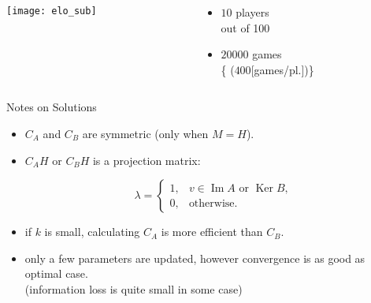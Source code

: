 \documentclass[fleqn,aspectratio=1610]{beamer}
\begin{document}
\begin{frame}[label={sec:org004bdab}]{}
\begin{columns}
\begin{column}{0.65\columnwidth}
\begin{center}
  \texttt{[image: elo\_sub]}%
\end{center}
\end{column}
\begin{column}{0.35\columnwidth}
\begin{itemize}
\item \(10\) players\\[0pt]
out of 100
\item \(20000\) games\\[0pt]
\{\small
(\(400\)[games/pl.])\}
\end{itemize}
\end{column}
\end{columns}
\end{frame}

\begin{frame}[label={sec:org22ea732}]{Notes on Solutions}
\begin{itemize}
\item \(C_{A}\) and \(C_{B}\) are symmetric (only when \(M=H\)).
\item \(C_{A}H\) or \(C_{B}H\) is a projection matrix:

\begin{equation}
  \lambda
  =
  \begin{cases}
    1,& v\in\operatorname{Im}A\text{ or }\operatorname{Ker}B,\\
    0,& \text{otherwise}.
  \end{cases}
\end{equation}
\item if \(k\) is small, calculating \(C_{A}\) is more efficient than \(C_{B}\).
\item only a few parameters are updated, however convergence is as
good as optimal case.\\[0pt]
(information loss is quite small in some case)
\end{itemize}
\end{frame}
\end{document}
